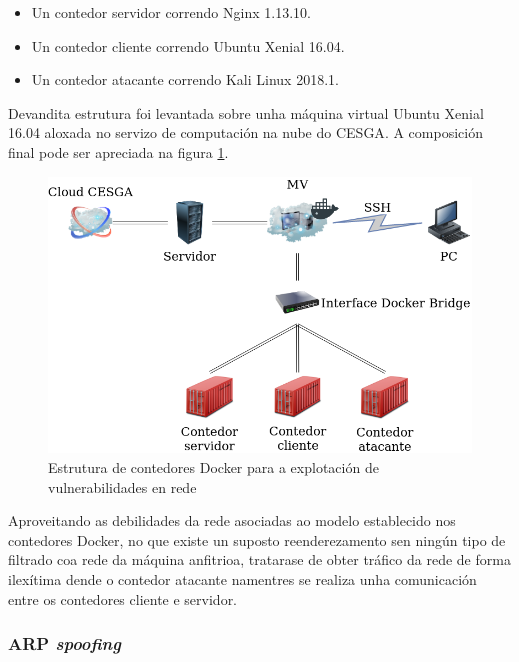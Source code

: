 \begin{itemize}
    \item Un contedor servidor correndo Nginx 1.13.10.
    \item Un contedor cliente correndo Ubuntu Xenial 16.04.
    \item Un contedor atacante correndo Kali Linux 2018.1.
\end{itemize}

Devandita estrutura foi levantada sobre unha máquina virtual Ubuntu Xenial 16.04 aloxada no servizo de computación na nube do \gls{CESGA}. A composición final pode ser apreciada na figura \ref{DiagramaRedeDockerCloud}.\\

\begin{figure}
\centerline{\includegraphics[width=15cm]{figuras/DiagramaRedeDockerCloud.png}}
\caption{Estrutura de contedores Docker para a explotación de vulnerabilidades en rede}
\label{DiagramaRedeDockerCloud}
\end{figure}

Aproveitando as debilidades da rede asociadas ao modelo establecido nos contedores Docker, no que existe un suposto reenderezamento sen ningún tipo de filtrado coa rede da máquina anfitrioa, tratarase de obter tráfico da rede de forma ilexítima dende o contedor atacante namentres se realiza unha comunicación entre os contedores cliente e servidor.

\subsubsection{\gls{ARP} \textit{spoofing}}


